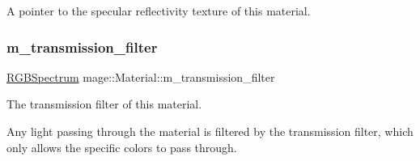 A pointer to the specular reflectivity texture of this material. \hypertarget{structmage_1_1_material_a9573a0d2a5fb0322f9eb103ace34dd47}{}\label{structmage_1_1_material_a9573a0d2a5fb0322f9eb103ace34dd47} 
\subsubsection{\texorpdfstring{m\+\_\+transmission\+\_\+filter}{m\_transmission\_filter}}
{\footnotesize\ttfamily \hyperlink{structmage_1_1_r_g_b_spectrum}{R\+G\+B\+Spectrum} mage\+::\+Material\+::m\+\_\+transmission\+\_\+filter\hspace{0.3cm}{\ttfamily [private]}}

The transmission filter of this material.

Any light passing through the material is filtered by the transmission filter, which only allows the specific colors to pass through. 